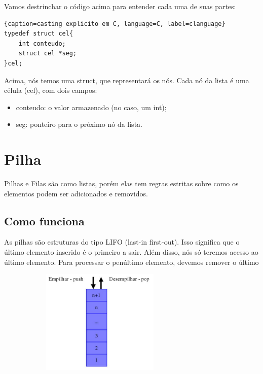 \documentclass{report}
\begin{document}
	Vamos destrinchar o código acima para entender cada uma de suas partes:
	
	\begin{center}
		
		\begin{lstlisting}{caption=casting explicito em C, language=C, label=clanguage}
typedef struct cel{
	int conteudo;
	struct cel *seg;
}cel;

		\end{lstlisting}
	\end{center}
	
	Acima, nós temos uma struct, que representará os nós. Cada nó da lista é uma célula (cel), com dois campos:
	
	\begin{itemize}
		\item conteudo: o valor armazenado (no caso, um int);
		\item seg: ponteiro para o próximo nó da lista.
	\end{itemize}
	
	
	\section{Pilha}
	
	Pilhas e Filas são como listas, porém elas tem regras estritas sobre como os elementos podem ser adicionados e removidos.
	
	
	\subsection{Como funciona}
	
	As pilhas são estruturas do tipo LIFO (last-in first-out). Isso significa que o último elemento inserido é o primeiro a sair. Além disso, nós só teremos acesso ao último elemento. Para processar o penúltimo elemento, devemos remover o último
	
		
	
	\begin{center}
		
		\includegraphics[width=10cm,height=5cm,keepaspectratio=false]{imagens/pilha.png}
		
	\end{center}
	
\end{document}
